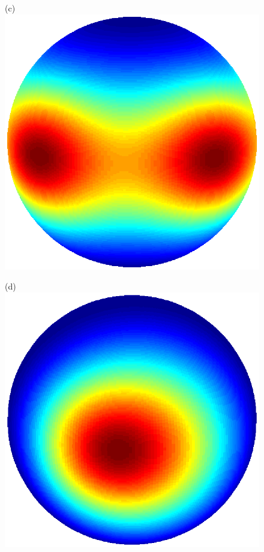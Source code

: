 \documentclass[dvips,aoas,preprint]{imsart}
\numberwithin{equation}{section}
\theoremstyle{plain}
\begin{document}
\begin{figure}[!htbp]
\begin{minipage}[]{0.10\textwidth}
  \end{minipage}
  \begin{minipage}[]{0.10\textwidth}
    \centering
    (c)
    \includegraphics*[width=\textwidth]{inspace3.ps}
  \end{minipage}
  \begin{minipage}[]{0.10\textwidth}
    \centering
    (d)
    \includegraphics*[width=\textwidth]{inspace0.ps}

\end{minipage}
\end{figure}
\end{document}
